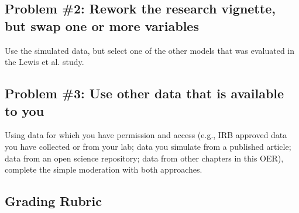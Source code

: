 \documentclass[
  11pt,
]{book}
\begin{document}
\hypertarget{problem-2-rework-the-research-vignette-but-swap-one-or-more-variables-2}{%
\subsection{Problem \#2: Rework the research vignette, but swap one or more variables}\label{problem-2-rework-the-research-vignette-but-swap-one-or-more-variables-2}}

Use the simulated data, but select one of the other models that was evaluated in the Lewis et al. \citeyearpar{lewis_applying_2017} study.

\hypertarget{problem-3-use-other-data-that-is-available-to-you-2}{%
\subsection{Problem \#3: Use other data that is available to you}\label{problem-3-use-other-data-that-is-available-to-you-2}}

Using data for which you have permission and access (e.g., IRB approved data you have collected or from your lab; data you simulate from a published article; data from an open science repository; data from other chapters in this OER), complete the simple moderation with both approaches.

\hypertarget{grading-rubric-6}{%
\subsection{Grading Rubric}\label{grading-rubric-6}}
\end{document}
